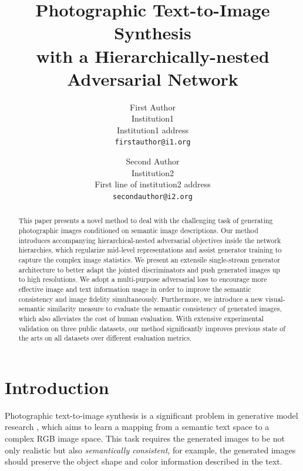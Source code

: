 \documentclass[10pt,twocolumn,letterpaper]{article}
\begin{document}
\title{Photographic Text-to-Image Synthesis \\ with a Hierarchically-nested Adversarial Network}

\author{First Author\\
Institution1\\
Institution1 address\\
{\tt\small firstauthor@i1.org}
\and
Second Author\\
Institution2\\
First line of institution2 address\\
{\tt\small secondauthor@i2.org}
}

\maketitle

\begin{abstract}
This paper presents a novel method to deal with the challenging task of generating photographic images conditioned on semantic image descriptions.
Our method introduces accompanying hierarchical-nested adversarial objectives inside the network hierarchies, which regularize mid-level representations and assist generator training to capture the complex image statistics. We present an extensile single-stream generator architecture to better adapt the jointed discriminators and push generated images up to high resolutions. We adopt a multi-purpose adversarial loss to encourage more effective image and text information usage in order to improve the semantic consistency and image fidelity simultaneously. Furthermore, we introduce a new visual-semantic similarity measure to evaluate the semantic consistency of generated images, which also alleviates the cost of human evaluation. With extensive experimental validation on three public datasets, our method significantly improves previous state of the arts on all datasets over different evaluation metrics. 


\end{abstract}

\section{Introduction}
Photographic text-to-image synthesis is a significant problem in generative model research \cite{reed2016generative}, which aims to learn a mapping from a semantic text space to a complex RGB image space. This task requires the generated images to be not only realistic but also \textit{semantically consistent}, for example, the generated images should preserve the object shape and color information described in the text.
\end{document}
